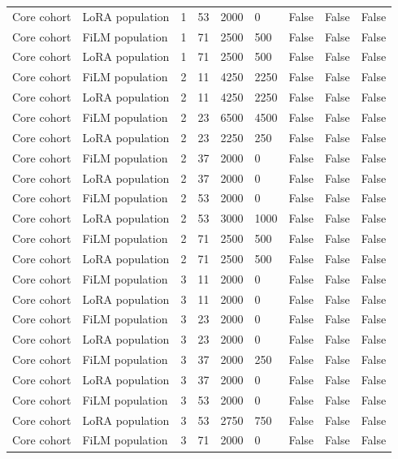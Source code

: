 \begin{longtable}{lllllllll}
Core cohort & LoRA population & 1 & 53 & 2000 & 0 & False & False & False \\
Core cohort & FiLM population & 1 & 71 & 2500 & 500 & False & False & False \\
Core cohort & LoRA population & 1 & 71 & 2500 & 500 & False & False & False \\
Core cohort & FiLM population & 2 & 11 & 4250 & 2250 & False & False & False \\
Core cohort & LoRA population & 2 & 11 & 4250 & 2250 & False & False & False \\
Core cohort & FiLM population & 2 & 23 & 6500 & 4500 & False & False & False \\
Core cohort & LoRA population & 2 & 23 & 2250 & 250 & False & False & False \\
Core cohort & FiLM population & 2 & 37 & 2000 & 0 & False & False & False \\
Core cohort & LoRA population & 2 & 37 & 2000 & 0 & False & False & False \\
Core cohort & FiLM population & 2 & 53 & 2000 & 0 & False & False & False \\
Core cohort & LoRA population & 2 & 53 & 3000 & 1000 & False & False & False \\
Core cohort & FiLM population & 2 & 71 & 2500 & 500 & False & False & False \\
Core cohort & LoRA population & 2 & 71 & 2500 & 500 & False & False & False \\
Core cohort & FiLM population & 3 & 11 & 2000 & 0 & False & False & False \\
Core cohort & LoRA population & 3 & 11 & 2000 & 0 & False & False & False \\
Core cohort & FiLM population & 3 & 23 & 2000 & 0 & False & False & False \\
Core cohort & LoRA population & 3 & 23 & 2000 & 0 & False & False & False \\
Core cohort & FiLM population & 3 & 37 & 2000 & 250 & False & False & False \\
Core cohort & LoRA population & 3 & 37 & 2000 & 0 & False & False & False \\
Core cohort & FiLM population & 3 & 53 & 2000 & 0 & False & False & False \\
Core cohort & LoRA population & 3 & 53 & 2750 & 750 & False & False & False \\
Core cohort & FiLM population & 3 & 71 & 2000 & 0 & False & False & False \\

\end{longtable}
